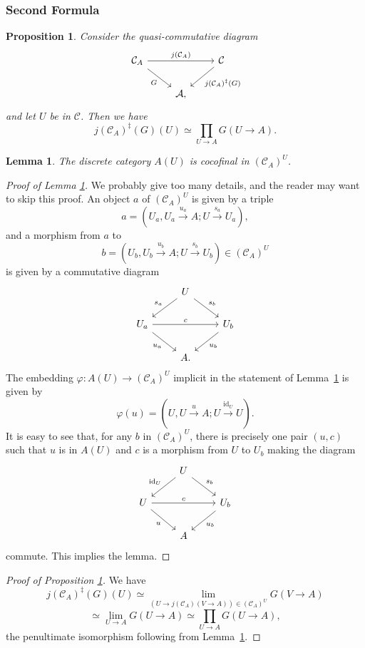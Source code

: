 \documentclass[12pt]{article}
\newtheorem{lem}[thm]{Lemma}
\newtheorem{prop}[thm]{Proposition}
\theoremstyle{remark}
\theoremstyle{definition}
\newcommand{\A}{\mathcal A}
\newcommand{\C}{\mathcal C}
\newcommand{\pp}{\varphi}
\newcommand{\xr}{\xrightarrow}
\DeclareMathOperator{\id}{id}
\begin{document}
%

\subsubsection{Second Formula}

\begin{prop}\label{prepa2a}
Consider the quasi-commutative diagram 
$$
\begin{tikzcd}
\C_A\ar{rr}{j(\C_A)}\ar{dr}[swap]{G}&&\C\ar{dl}{j(\C_A)^\ddagger(G)}\\ 
{}&\A,
\end{tikzcd}
$$ 
and let $U$ be in $\C$. Then we have 
\begin{equation}\label{prepa2}
j(\C_A)^\ddagger(G)(U)\simeq\prod_{U\to A}G(U\to A).
\end{equation} 
\end{prop}

\begin{lem}\label{cicau}
The discrete category $A(U)$ is cocofinal in $(\C_A)^U$.
\end{lem}

\begin{proof}[Proof of Lemma \ref{cicau}]
We probably give too many details, and the reader may want to skip this proof. An object $a$ of $(\C_A)^U$ is given by a triple 
$$
a=(U_a,U_a\xr{u_a}A;U\xr{s_a}U_a),
$$ 
and a morphism from $a$ to 
$$
b=(U_b,U_b\xr{u_b}A;U\xr{s_b}U_b)\in(\C_A)^U
$$ 
is given by a commutative diagram 
$$
\begin{tikzcd}
{}&U\ar{dl}[swap]{s_a}\ar{dr}{s_b}\\ 
U_a\ar{dr}[swap]{u_a}\ar{rr}{c}&&U_b\ar{dl}{u_b}\\ 
{}&A.
\end{tikzcd}
$$ 
The embedding $\pp:A(U)\to(\C_A)^U$ implicit in the statement of Lemma~\ref{cicau} is given by 
$$
\pp(u)=(U,U\xr uA;U\xr{\id_U}U). 
$$ 
It is easy to see that, for any $b$ in $(\C_A)^U$, there is precisely one pair $(u,c)$ such that $u$ is in $A(U)$ and $c$ is a morphism from $U$ to $U_b$ making the diagram 
$$
\begin{tikzcd}
{}&U\ar{dl}[swap]{\id_U}\ar{dr}{s_b}\\ 
U\ar{dr}[swap]{u}\ar{rr}{c}&&U_b\ar{dl}{u_b}\\ 
{}&A
\end{tikzcd}
$$ 
commute. This implies the lemma. 
\end{proof}

\begin{proof}[Proof of Proposition \ref{prepa2a}]
We have 
$$
j(\C_A)^\ddagger(G)(U)\simeq\lim_{(U\to j(\C_A)(V\to A))\in(\C_A)^U}G(V\to A)
$$
$$
\simeq\lim_{U\to A}G(U\to A)\simeq\prod_{U\to A}G(U\to A),
$$
the penultimate isomorphism following from Lemma~\ref{cicau}. 
\end{proof} 
\end{document}
